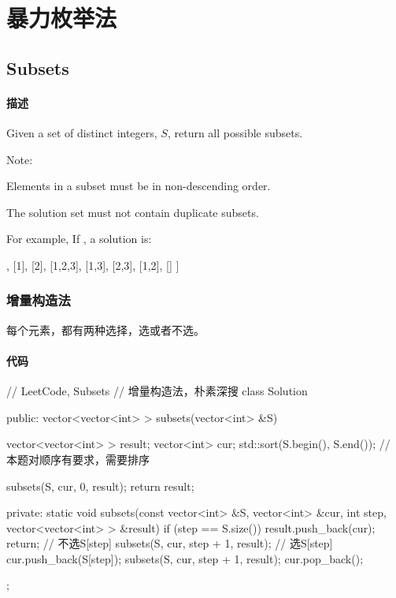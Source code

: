 \chapter{暴力枚举法}


\section{Subsets} %
\label{sec:subsets}


\subsubsection{描述}
Given a set of distinct integers, $S$, return all possible subsets.

Note:
\begindot
\item Elements in a subset must be in non-descending order.
\item The solution set must not contain duplicate subsets.
\myenddot

For example, If , a solution is:
\begin{Code}
[
  [3],
  [1],
  [2],
  [1,2,3],
  [1,3],
  [2,3],
  [1,2],
  []
]
\end{Code}


\subsection{增量构造法}
每个元素，都有两种选择，选或者不选。

\subsubsection{代码}
\begin{Code}
// LeetCode, Subsets
// 增量构造法，朴素深搜
class Solution {
public:
    vector<vector<int> > subsets(vector<int> &S) {
        vector<vector<int> > result;
        vector<int> cur;
        std::sort(S.begin(), S.end()); // 本题对顺序有要求，需要排序

        subsets(S, cur, 0, result);
        return result;
    }

private:
    static void subsets(const vector<int> &S, vector<int> &cur, int step,
            vector<vector<int> > &result) {
        if (step == S.size()) {
            result.push_back(cur);
            return;
        }
        // 不选S[step]
        subsets(S, cur, step + 1, result);
        // 选S[step]
        cur.push_back(S[step]);
        subsets(S, cur, step + 1, result);
        cur.pop_back();
    }
};
\end{Code}


